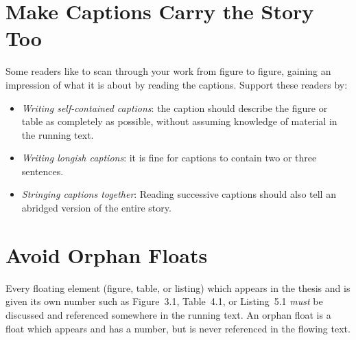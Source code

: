 \section{Make Captions Carry the Story Too}

Some readers like to scan through your work from figure to figure,
gaining an impression of what it is about by reading the captions.
Support these readers by:
\begin{itemize}
\item \emph{Writing self-contained captions}: the caption
should describe the figure or table as completely as possible, without
assuming knowledge of material in the running text.

\item \emph{Writing longish captions}: it is fine for
captions to contain two or three sentences.

\item \emph{Stringing captions together}: Reading successive captions
should also tell an abridged version of the entire story.
\end{itemize}




\section{Avoid Orphan Floats}

Every floating element (figure, table, or listing) which appears in
the thesis and is given its own number such as Figure~3.1, Table~4.1,
or Listing~5.1 \emph{must} be discussed and referenced somewhere in
the running text. An orphan float is a float which appears and has a
number, but is never referenced in the flowing text.


